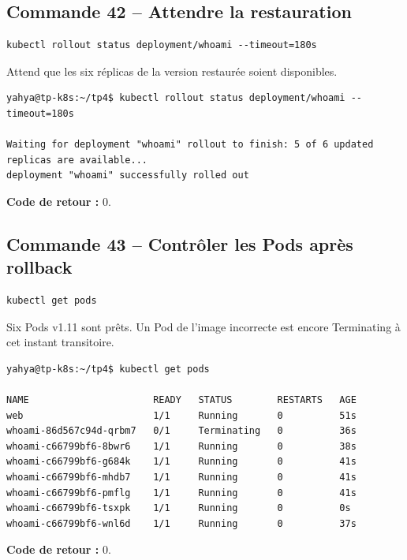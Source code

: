 \documentclass[11pt,a4paper]{article}
\begin{document}
\subsection{Commande 42 -- Attendre la restauration}
\begin{lstlisting}
kubectl rollout status deployment/whoami --timeout=180s
\end{lstlisting}
Attend que les six réplicas de la version restaurée soient disponibles.
\begin{tcolorbox}[terminal,title={Ubuntu / WSL2 -- Commande 42 -- rendu reconstitué}]
\begin{Verbatim}[fontsize=\scriptsize,breaklines=true,breakanywhere=true,breaksymbolleft={},breaksymbolright={}]
yahya@tp-k8s:~/tp4$ kubectl rollout status deployment/whoami --timeout=180s

Waiting for deployment "whoami" rollout to finish: 5 of 6 updated replicas are available...
deployment "whoami" successfully rolled out
\end{Verbatim}
\end{tcolorbox}
\textbf{Code de retour :} 0.

\subsection{Commande 43 -- Contrôler les Pods après rollback}
\begin{lstlisting}
kubectl get pods
\end{lstlisting}
Six Pods v1.11 sont prêts. Un Pod de l’image incorrecte est encore Terminating à cet instant transitoire.
\begin{tcolorbox}[terminal,title={Ubuntu / WSL2 -- Commande 43 -- rendu reconstitué}]
\begin{Verbatim}[fontsize=\scriptsize,breaklines=true,breakanywhere=true,breaksymbolleft={},breaksymbolright={}]
yahya@tp-k8s:~/tp4$ kubectl get pods

NAME                      READY   STATUS        RESTARTS   AGE
web                       1/1     Running       0          51s
whoami-86d567c94d-qrbm7   0/1     Terminating   0          36s
whoami-c66799bf6-8bwr6    1/1     Running       0          38s
whoami-c66799bf6-g684k    1/1     Running       0          41s
whoami-c66799bf6-mhdb7    1/1     Running       0          41s
whoami-c66799bf6-pmflg    1/1     Running       0          41s
whoami-c66799bf6-tsxpk    1/1     Running       0          0s
whoami-c66799bf6-wnl6d    1/1     Running       0          37s
\end{Verbatim}
\end{tcolorbox}
\textbf{Code de retour :} 0.
\end{document}
